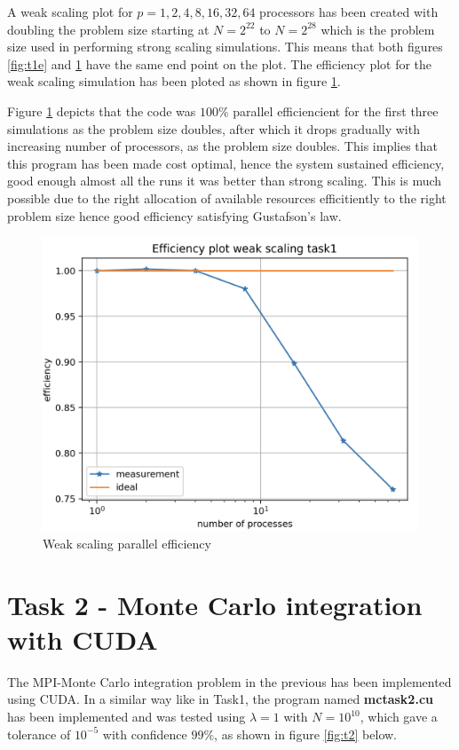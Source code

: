 \documentclass[12pt,a4paper]{article}
\begin{document}
\begin{enumerate}
A weak scaling plot for $p = 1, 2, 4, 8, 16, 32, 64$ processors has been created with doubling the problem size starting at $N=2^{22}$  to $N=2^{28}$ which is the  problem size used in performing strong scaling simulations. This means that both figures \ref{fig:t1e} and \ref{fig:t1we} have the same end point on the plot. The efficiency plot for the weak scaling  simulation has been ploted as shown in figure \ref{fig:t1we}.

Figure \ref{fig:t1we} depicts that the code was $100\%$ parallel efficiencient for the first three simulations as the problem size doubles, after which  it  drops gradually with increasing number of processors, as the problem size doubles. This implies that this program has been made cost optimal, hence the system sustained efficiency, good enough  almost all the runs it was better than strong scaling. This is much possible due to the right allocation of available resources efficitiently to the right problem size hence good efficiency satisfying Gustafson's law.

\begin{figure}[H]
	\centering
	\includegraphics[width=0.7\linewidth]{t1we}
	\caption{Weak scaling parallel efficiency}
	\label{fig:t1we}
\end{figure}
\end{enumerate}

\section*{Task 2 - Monte Carlo integration with CUDA}
The MPI-Monte Carlo integration problem in the previous has been implemented using CUDA. In a similar way like in Task1, the program named \textbf{mc\textunderscore task2.cu} has been implemented and was tested using $\lambda = 1$  with  $N= 10^{10}$, which gave a tolerance of $10^{-5}$ with confidence $99\%$, as shown in figure \ref{fig:t2} below.
\end{document}

